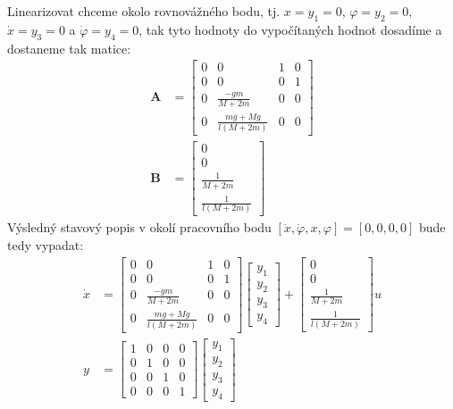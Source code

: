 \documentclass[a4paper, 12pt]{article}
\begin{document}
			Linearizovat chceme okolo rovnovážného bodu, tj. $x = y_1 = 0$, $\varphi = y_2 = 0$, $\dot{x} = y_3 = 0$ a $\dot{\varphi} = y_4 = 0$, tak tyto hodnoty do vypočítaných hodnot dosadíme a dostaneme tak matice:
			\begin{align*}
				\mathbf{A} &= \left[\begin{matrix}
					0 & 0 & 1 & 0\\
					0 & 0 & 0 & 1\\
					0 & \frac{-gm}{M+2m} & 0 & 0\\
					0 & \frac{mg+Mg}{l\left(M+2m\right)} & 0 & 0
				\end{matrix}\right]\\
				\mathbf{B} &= \left[\begin{matrix}
					0\\
					0\\
					\frac{1}{M+2m}\\
					\frac{1}{l\left(M+2m\right)}
				\end{matrix}\right]
			\end{align*}
			Výsledný stavový popis v okolí pracovního bodu $\left[\dot{x}, \dot{\varphi}, x, \varphi\right]=\left[0, 0, 0, 0\right]$ bude tedy vypadat:
			\begin{align*}
				\dot{x}&=\left[\begin{matrix}
					0 & 0 & 1 & 0\\
					0 & 0 & 0 & 1\\
					0 & \frac{-gm}{M+2m} & 0 & 0\\
					0 & \frac{mg+Mg}{l\left(M+2m\right)} & 0 & 0
				\end{matrix}\right]
				\left[\begin{matrix}
					y_1\\
					y_2\\
					y_3\\
					y_4
				\end{matrix}\right]
				+
				\left[\begin{matrix}
					0\\
					0\\
					\frac{1}{M+2m}\\
					\frac{1}{l\left(M+2m\right)}
				\end{matrix}\right]u\\
				y&=\left[\begin{matrix}
					1 & 0 & 0 & 0\\
					0 & 1 & 0 & 0\\
					0 & 0 & 1 & 0\\
					0 & 0 & 0 & 1
				\end{matrix}\right]
				\left[\begin{matrix}
					y_1\\
					y_2\\
					y_3\\
					y_4
				\end{matrix}\right]
			\end{align*}
\end{document}

